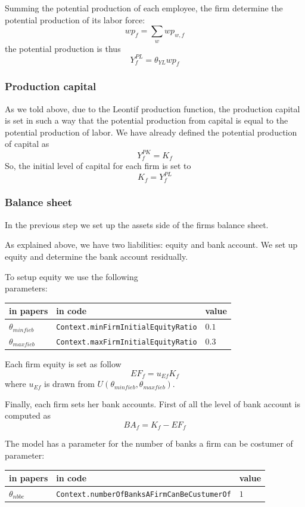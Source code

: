 \documentclass{book}
\begin{document}
Summing the potential production of each employee, the firm determine the potential production of its labor force:
\[
	wp_f=\sum_{w}wp_{w,f}
\]
the potential production is thus
\[
	Y^{PL}_f=\theta_{YL}wp_f
\]

\subsubsection{Production capital}
As we told above, due to the Leontif production function, the production capital is set in such a way that the potential production from capital is equal to the potential production of labor. We have already defined the potential production of capital as
\[Y_f^{PK}=K_f\]
So, the initial level of capital for each firm is set to
\[
K_f=Y^{PL}_f
\]
\subsubsection{Balance sheet}

In the previous step we set up the assets side of the firms balance sheet.

As explained above, we have two liabilities: equity and bank account. We set up equity and determine the bank account residually.

To setup equity we use the following\\
parameters:\\
\begin{tabular}{l l l}
	\hline
	in papers& in code&value\\
	\hline
	\hline
 $\theta_{minfieb}$&\verb+Context.minFirmInitialEquityRatio+&$0.1$\\
 $\theta_{maxfieb}$&\verb+Context.maxFirmInitialEquityRatio+&$0.3$\\
	\hline
\end{tabular}

\vskip5mm
Each firm equity is set as follow
\[
	EF_f=u_{Ef}K_f
\]
where $u_{Ef}$ is drawn from $U(\theta_{minfieb},\theta_{maxfieb})$.

Finally, each firm sets her bank accounts. First of all the level of bank account is computed as
\[
BA_f=K_f-EF_f
\]

The model has a parameter for the number of banks a firm can be costumer of\\
parameter:\\
\begin{tabular}{l l l}
	\hline
	in papers& in code&value\\
	\hline
	\hline
 $\theta_{nbbc}$&\verb+Context.numberOfBanksAFirmCanBeCustumerOf+&$1$\\
	\hline
\end{tabular}
\end{document}
